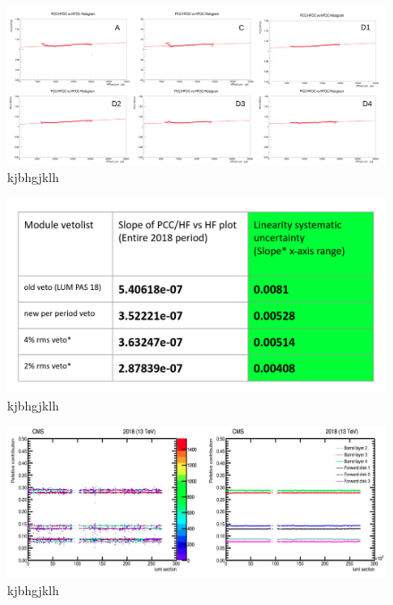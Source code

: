 \begin{figure}[!htp]
\centering
\includegraphics[width=1\textwidth]{ashish_thesis/pcc_hfoc_linearity_sys_unc_2per_common_veto.png}
\caption{%
kjbhgjklh
}
\label{fig:linearitypcchfoc}
\end{figure}


\begin{figure}[!htp]
\centering
\includegraphics[width=1\textwidth]{ashish_thesis/lineairty_diff_veto_sys_unc.png}
\caption{%
kjbhgjklh
}
\label{fig:linearitypcchfoc}
\end{figure}

\begin{figure}[!htp]
\centering
\includegraphics[width=1\textwidth]{ashish_thesis/pcc_layer_disk_stability_4_commonveto.png}
\caption{%
kjbhgjklh
}
\label{fig:linearitypcchfoc}
\end{figure}

